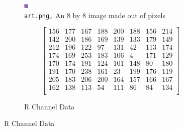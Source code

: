 \documentclass{article}
\begin{document}
\begin{figure}[h]
\tiny
\begin{subfigure}{0.5\textwidth}
\begin{center}
	\includegraphics[width=\linewidth]{./implementation/Photos/art.png}
\end{center}
\caption{\texttt{art.png,} An 8 by 8 image made out of pixels}
\end{subfigure}
\begin{subfigure}{0.5\textwidth}
\begin{equation*}
\begin{bmatrix}
	156 & 177 & 167 & 188 & 200 & 188 & 156 & 214 \\
	142 & 200 & 186 & 169 & 139 & 133 & 179 & 149 \\
	212 & 196 & 122 &  97 & 131 &  42 & 113 & 174 \\
	174 & 169 & 253 & 183 & 106 &   4 & 171 & 129 \\
	170 & 174 & 191 & 124 & 101 & 148 &  80 & 180 \\
	191 & 170 & 238 & 161 &  23 & 199 & 176 & 119 \\
	205 & 183 & 206 & 200 & 164 & 157 & 166 & 167 \\
	162 & 138 & 113 &  54 & 111 &  86 &  84 & 134 \\
\end{bmatrix}
\end{equation*}
\caption{R Channel Data}
\end{subfigure}


\end{figure}
\end{document}
